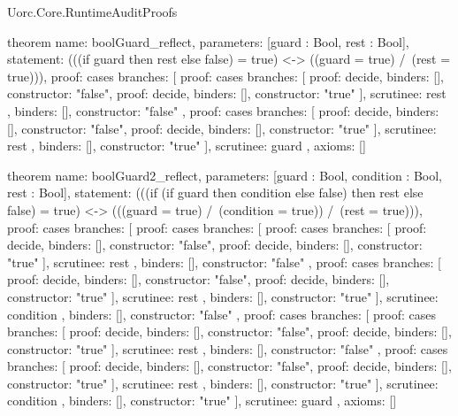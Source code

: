 \begin{lexlean}{Uorc.Core.RuntimeAuditProofs}
\begin{semanticmodule}
theorem{
  name: boolGuard_reflect,
  parameters: [guard : Bool, rest : Bool],
  statement: (((if guard then rest else false) = true) <-> ((guard = true) /\ (rest = true))),
  proof: cases{
    branches: [
      {
        proof: cases{
          branches: [
            {proof: decide{}, binders: [], constructor: "false"},
            {proof: decide{}, binders: [], constructor: "true"}
          ],
          scrutinee: rest
        },
        binders: [],
        constructor: "false"
      },
      {
        proof: cases{
          branches: [
            {proof: decide{}, binders: [], constructor: "false"},
            {proof: decide{}, binders: [], constructor: "true"}
          ],
          scrutinee: rest
        },
        binders: [],
        constructor: "true"
      }
    ],
    scrutinee: guard
  },
  axioms: []
}

theorem{
  name: boolGuard2_reflect,
  parameters: [guard : Bool, condition : Bool, rest : Bool],
  statement: (((if (if guard then condition else false) then rest else false) = true) <-> (((guard = true) /\ (condition = true)) /\ (rest = true))),
  proof: cases{
    branches: [
      {
        proof: cases{
          branches: [
            {
              proof: cases{
                branches: [
                  {proof: decide{}, binders: [], constructor: "false"},
                  {proof: decide{}, binders: [], constructor: "true"}
                ],
                scrutinee: rest
              },
              binders: [],
              constructor: "false"
            },
            {
              proof: cases{
                branches: [
                  {proof: decide{}, binders: [], constructor: "false"},
                  {proof: decide{}, binders: [], constructor: "true"}
                ],
                scrutinee: rest
              },
              binders: [],
              constructor: "true"
            }
          ],
          scrutinee: condition
        },
        binders: [],
        constructor: "false"
      },
      {
        proof: cases{
          branches: [
            {
              proof: cases{
                branches: [
                  {proof: decide{}, binders: [], constructor: "false"},
                  {proof: decide{}, binders: [], constructor: "true"}
                ],
                scrutinee: rest
              },
              binders: [],
              constructor: "false"
            },
            {
              proof: cases{
                branches: [
                  {proof: decide{}, binders: [], constructor: "false"},
                  {proof: decide{}, binders: [], constructor: "true"}
                ],
                scrutinee: rest
              },
              binders: [],
              constructor: "true"
            }
          ],
          scrutinee: condition
        },
        binders: [],
        constructor: "true"
      }
    ],
    scrutinee: guard
  },
  axioms: []
}


\end{semanticmodule}
\end{lexlean}
